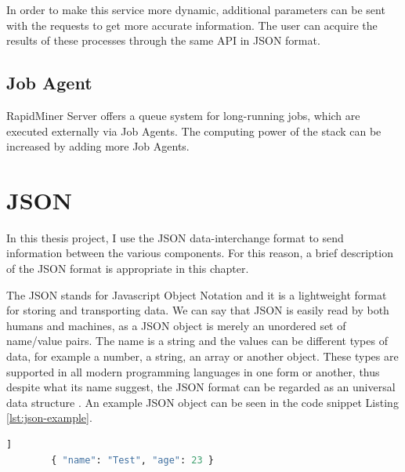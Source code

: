 In order to make this service more dynamic, additional parameters can be sent with the requests to get more accurate information. The user can acquire the results of these processes through the same API in JSON format.

\subsection{Job Agent}

RapidMiner Server offers a queue system for long-running jobs, which are executed externally via Job Agents. The computing power of the stack can be increased by adding more Job Agents.

\section{JSON}


In this thesis project, I use the JSON data-interchange format to send information between the various components. For this reason, a brief description of the JSON format is appropriate in this chapter.

The JSON stands for Javascript Object Notation and it is a lightweight format for storing and transporting data. We can say that JSON is easily read by both humans and machines, as a JSON object is merely an unordered set of name/value pairs. The name is a string and the values can be different types of data, for example a number, a string, an array or another object. These types are supported in all modern programming languages in one form or another, thus despite what its name suggest, the JSON format can be regarded as an universal data structure \cite{json}.
 An example JSON object can be seen in the code snippet Listing \ref{lst:json-example}.

\begin{center}
	\begin{minipage}{0.6\linewidth}
		\begin{lstlisting}[language=Python, caption={Example JSON}, label={lst:json-example}]]
		{ "name": "Test", "age": 23 }\end{lstlisting}
	\end{minipage}
\end{center}





